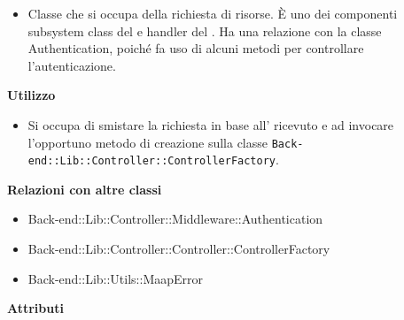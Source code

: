 					\begin{itemize}
						\item[] Classe che si occupa della richiesta di risorse. È uno dei componenti subsystem class del   e handler del  . Ha una relazione con la classe Authentication, poiché fa uso di alcuni metodi per controllare l'autenticazione.
					\end{itemize}      
				\textbf{Utilizzo}  
					\begin{itemize}
						\item[] Si occupa di smistare la richiesta in base all' ricevuto e ad invocare l'opportuno metodo di creazione sulla classe \texttt{Back-end::Lib::Controller::ControllerFactory}.
					\end{itemize}
					\textbf{Relazioni con altre classi}
					\begin{itemize}
							\item{Back-end::Lib::Controller::Middleware::Authentication}
							\item{Back-end::Lib::Controller::Controller::ControllerFactory}
							\item{Back-end::Lib::Utils::MaapError}
					\end{itemize}
			 \textbf{Attributi} 
	\begin{itemize}
		\end{itemize}
		
